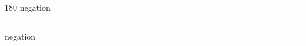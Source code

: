 
\begin{frame}
\begin{center}
\begin{turn}{180}
{\fontsize{2.5cm}{1em}\selectfont negation}
\end{turn}
\vspace{1em}\par  
\hrule
\vspace{1em}\par  
{\fontsize{2.5cm}{1em}\selectfont negation}
\end{center}
\end{frame}

